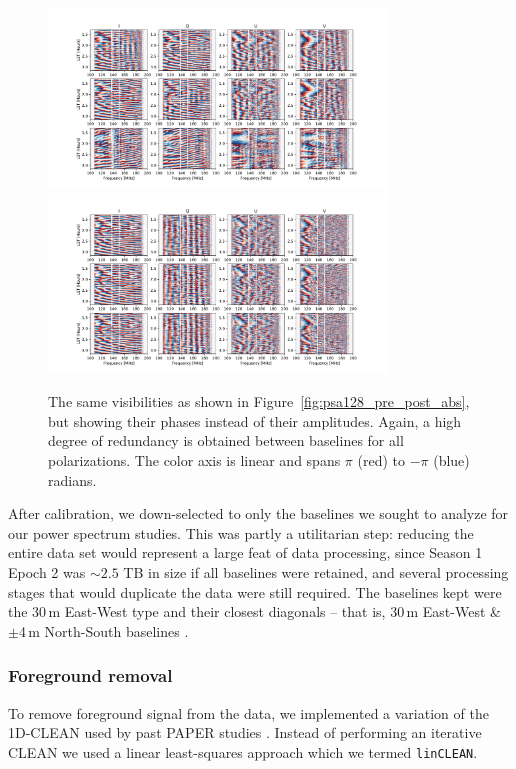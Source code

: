 \begin{figure}
\centering
\includegraphics[width=0.8\textwidth]{chapters/psa128_pol/figures/nocal_IQUV_6680_phase.pdf}
\includegraphics[width=0.8\textwidth]{chapters/psa128_pol/figures/omnical_IQUV_6680_phase.pdf}
\caption[The same visibilities as shown in Figure~\ref{fig:psa128_pre_post_abs}, but showing their phases instead of their amplitudes.]{The same visibilities as shown in Figure~\ref{fig:psa128_pre_post_abs}, but showing their phases instead of their amplitudes. Again, a high degree of redundancy is obtained between baselines for all polarizations. The color axis is linear and spans $\pi$ (red) to $-\pi$ (blue) radians.}
\label{fig:psa128_pre_post_phs}
\end{figure}

After calibration, we down-selected to only the baselines we sought to analyze for our power spectrum studies. This was partly a utilitarian step: reducing the entire data set would represent a large feat of data processing, since Season 1 Epoch 2 was $\sim2.5$ TB in size if all baselines were retained, and several processing stages that would duplicate the data were still required. The baselines kept were the 30\,m East-West type and their closest diagonals -- that is, 30\,m East-West \& $\pm$4\,m North-South baselines \citep[e.g.][]{Parsons.14}.

\subsubsection{Foreground removal}
To remove foreground signal from the data, we implemented a variation of the 1D-CLEAN \citep{ParsonsBacker.09} used by past PAPER studies \citep{Parsons.14, Ali.15, Jacobs.15, Moore.17, Kerrigan.18}. Instead of performing an iterative CLEAN we used a linear least-squares approach which we termed {\tt linCLEAN}.


